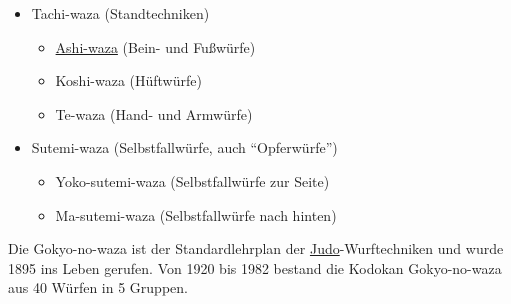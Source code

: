 \documentclass[justified, a4paper, notitlepage, captions=tableheading, nobib]{tufte-handout}
\begin{document}
\begin{itemize}
\item \label{orgae58a29}Tachi-waza (Standtechniken)
\begin{itemize}
\item \hyperref[org4ce3ed7]{Ashi-waza} (Bein- und Fußwürfe)
\item Koshi-waza (Hüftwürfe)
\item Te-waza (Hand- und Armwürfe)
\end{itemize}
\item Sutemi-waza (Selbstfallwürfe, auch "`Opferwürfe"')
\begin{itemize}
\item Yoko-sutemi-waza (Selbstfallwürfe zur Seite)
\item Ma-sutemi-waza (Selbstfallwürfe nach hinten)
\end{itemize}
\end{itemize}

Die Gokyo-no-waza ist der Standardlehrplan der \hyperref[org6f56467]{Judo}-Wurftechniken und wurde 1895 ins Leben gerufen. Von 1920
bis 1982 bestand die Kodokan Gokyo-no-waza aus 40 Würfen in 5 Gruppen.
\end{document}
